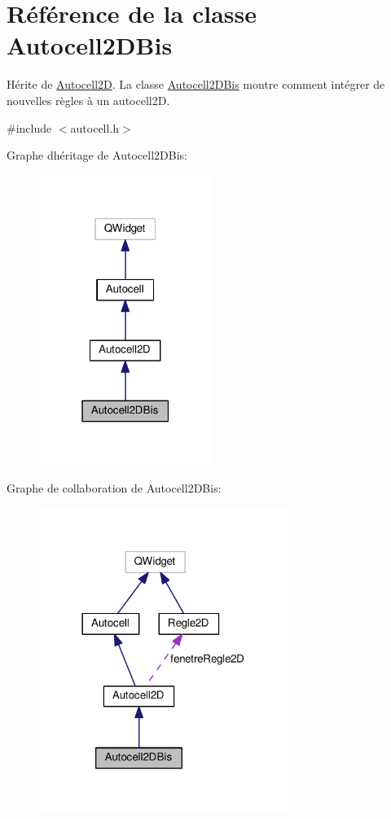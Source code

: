 \hypertarget{class_autocell2_d_bis}{}\section{Référence de la classe Autocell2\+D\+Bis}
\label{class_autocell2_d_bis}


Hérite de \hyperlink{class_autocell2_d}{Autocell2D}. La classe \hyperlink{class_autocell2_d_bis}{Autocell2\+D\+Bis} montre comment intégrer de nouvelles règles à un autocell2D.  




{\ttfamily \#include $<$autocell.\+h$>$}



Graphe d\textquotesingle{}héritage de Autocell2\+D\+Bis\+:
\nopagebreak
\begin{figure}[H]
\begin{center}
\leavevmode
\includegraphics[width=159pt]{class_autocell2_d_bis__inherit__graph}
\end{center}
\end{figure}


Graphe de collaboration de Autocell2\+D\+Bis\+:
\nopagebreak
\begin{figure}[H]
\begin{center}
\leavevmode
\includegraphics[width=230pt]{class_autocell2_d_bis__coll__graph}
\end{center}
\end{figure}
